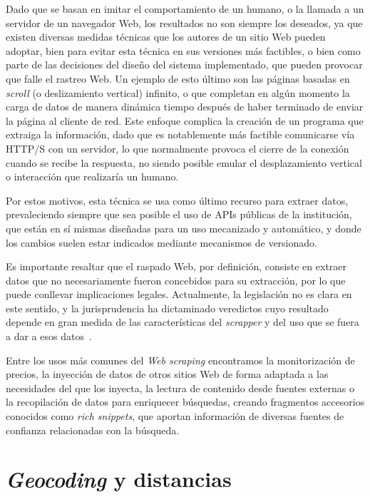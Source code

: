 Dado que se basan en imitar el comportamiento de un humano, o la llamada a un servidor de un navegador Web, los resultados no son siempre los deseados, ya que existen diversas medidas técnicas que los autores de un sitio Web pueden adoptar, bien para evitar esta técnica en sus versiones más factibles, o bien como parte de las decisiones del diseño del sistema implementado, que pueden provocar que falle el rastreo Web. Un ejemplo de esto último son las páginas basadas en \textit{scroll} (o deslizamiento vertical) infinito, o que completan en algún momento la carga de datos de manera dinámica tiempo después de haber terminado de enviar la página al cliente de red. Este enfoque complica la creación de un programa que extraiga la información, dado que es notablemente más factible comunicarse vía HTTP/S con un servidor, lo que normalmente provoca el cierre de la conexión cuando se recibe la respuesta, no siendo posible emular el desplazamiento vertical o interacción que realizaría un humano.

Por estos motivos, esta técnica se usa como último recurso para extraer datos, prevaleciendo siempre que sea posible el uso de APIs públicas de la institución, que están en sí mismas diseñadas para un uso mecanizado y automático, y donde los cambios suelen estar indicados mediante mecanismos de versionado.

Es importante resaltar que el raspado Web, por definición, consiste en extraer datos que no necesariamente fueron concebidos para su extracción, por lo que puede conllevar implicaciones legales. Actualmente, la legislación no es clara en este sentido, y la jurisprudencia ha dictaminado veredictos cuyo resultado depende en gran medida de las características del \textit{scrapper} y del uso que se fuera a dar a esos datos~\cite{scraping_legal, ryanair}.

Entre los usos más comunes del \textit{Web scraping} encontramos la monitorización de precios, la inyección de datos de otros sitios Web de forma adaptada a las necesidades del que los inyecta, la lectura de contenido desde fuentes externas o la recopilación de datos para enriquecer búsquedas, creando fragmentos accesorios conocidos como \textit{rich snippets}, que aportan información de diversas fuentes de confianza relacionadas con la búsqueda.

\section{\textit{Geocoding} y distancias}

